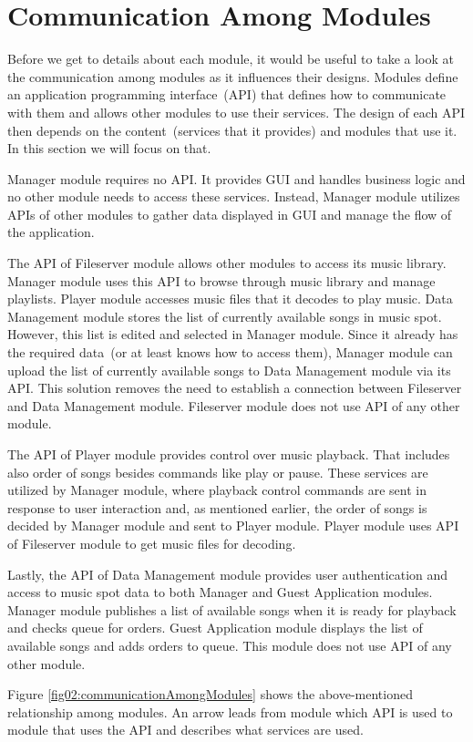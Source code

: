 \section{Communication Among Modules}

Before we get to details about each module, it would be useful to take a look at the communication among modules as it influences their designs. Modules define an application programming interface~(API) that defines how to communicate with them and allows other modules to use their services. The design of each API then depends on the content~(services that it provides) and modules that use it. In this section we will focus on that.
\par
Manager module requires no API. It provides GUI and handles business logic and no other module needs to access these services. Instead, Manager module utilizes APIs of other modules to gather data displayed in GUI and manage the flow of the application.
\par
The API of Fileserver module allows other modules to access its music library. Manager module uses this API to browse through music library and manage playlists. Player module accesses music files that it decodes to play music. Data Management module stores the list of currently available songs in music spot. However, this list is edited and selected in Manager module. Since it already has the required data~(or at least knows how to access them), Manager module can upload the list of currently available songs to Data Management module via its API. This solution removes the need to establish a connection between Fileserver and Data Management module. Fileserver module does not use API of any other module.
\par
The API of Player module provides control over music playback. That includes also order of songs besides commands like play or pause. These services are utilized by Manager module, where playback control commands are sent in response to user interaction and, as mentioned earlier, the order of songs is decided by Manager module and sent to Player module. Player module uses API of Fileserver module to get music files for decoding.
\par
Lastly, the API of Data Management module provides user authentication and access to music spot data to both Manager and Guest Application modules. Manager module publishes a list of available songs when it is ready for playback and checks queue for orders. Guest Application module displays the list of available songs and adds orders to queue. This module does not use API of any other module.
\par
Figure \ref{fig02:communicationAmongModules} shows the above-mentioned relationship among modules. An arrow leads from module which API is used to module that uses the API and describes what services are used.

